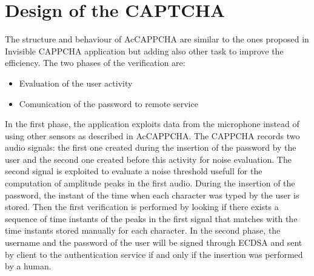 \chapter{Design of the CAPTCHA}
The structure and behaviour of AcCAPPCHA are similar to the ones proposed in Invisible CAPPCHA application but adding also other task to improve the efficiency. The two phases of the verification are:
\begin{itemize}
\item{Evaluation of the user activity}
\item{Comunication of the password to remote service}
\end{itemize}
In the first phase, the application exploits data from the microphone instead of using other sensors as described in AcCAPPCHA. The CAPPCHA records two audio signals: the first one created during the insertion of the password by the user and the second one created before this activity for noise evaluation. The second signal is exploited to evaluate a noise threshold usefull for the computation of amplitude peaks in the first audio. During the insertion of the password, the instant of the time when each character was typed by the user is stored. Then the first verification is performed by looking if there exists a sequence of time instants of the peaks in the first signal that matches with the time instants stored manually for each character. 
In the second phase, the username and the password of the user will be signed through ECDSA and sent by client to the authentication service if and only if the insertion was performed by a human.

